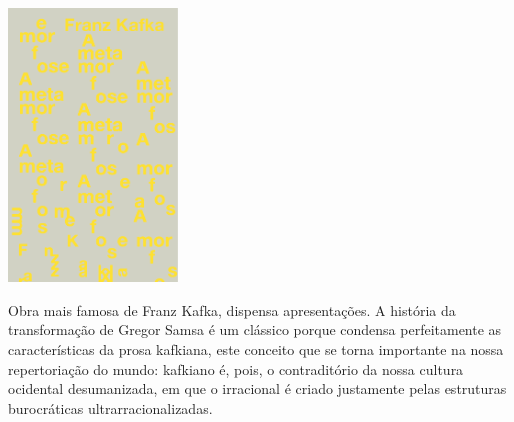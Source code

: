 \begin{center}
\hspace*{-4.5cm}
\hspace*{4cm}\includegraphics[width=45mm]{./imgs/kafka.png}
\end{center}

\hspace*{-7cm}\hrulefill\hspace*{-7cm}

\medskip

\noindent{}Obra mais famosa de Franz Kafka, {} dispensa apresentações. A história da transformação de Gregor Samsa é um clássico porque condensa perfeitamente as características da prosa kafkiana, este conceito que se torna importante na nossa repertoriação do mundo: kafkiano é, pois, o contraditório da nossa cultura ocidental desumanizada, em que o irracional é criado justamente pelas estruturas burocráticas ultrarracionalizadas.

\vfill

\hspace*{-.4cm}\begin{minipage}[c]{1\linewidth}
\small{
{}}
\end{minipage}


